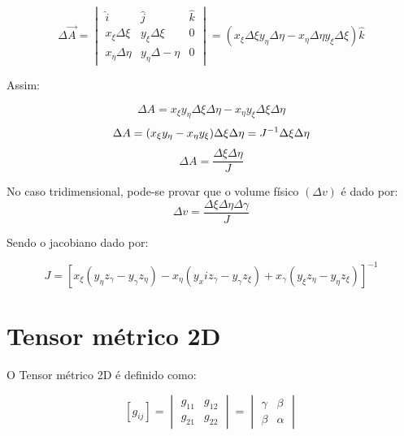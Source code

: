 \begin{equation*}
    \Delta \vec{A} =
    \begin{vmatrix}
        \hat{i} & \hat{j} & \hat{k}\\
        x_\xi \Delta \xi & y_\xi \Delta \xi & 0\\
        x_\eta \Delta \eta & y_\eta \Delta -\eta & 0
    \end{vmatrix}
    = (x_\xi \Delta \xi y_\eta \Delta \eta - x_\eta \Delta \eta y_\xi \Delta \xi)\hat{k}
\end{equation*}

Assim:

\begin{equation*}
    \Delta A = x_\xi y_\eta \Delta \xi \Delta \eta - x_\eta y_\xi \Delta \xi \Delta \eta
\end{equation*}
\begin{equation*}
    \Delta A = (x_\xi y_\eta - x_\eta y_\xi)\Delta \xi \Delta \eta = J^{-1} \Delta \xi \Delta \eta\\
\end{equation*}    
\begin{equation}
    \label{eq:2.15}
    \Delta A = \frac{\Delta \xi \Delta \eta}{J}
\end{equation}

No caso tridimensional, pode-se provar que o volume físico $(\Delta v)$ é dado por:
\begin{equation}
    \label{eq:2.16}
    \Delta v = \frac{\Delta \xi \Delta \eta \Delta \gamma}{J}
\end{equation}

Sendo o jacobiano dado por:

\begin{equation}
    \label{eq:2.17}
    J = [x_\xi(y_\eta z_\gamma - y_\gamma z_\eta) - x_\eta(y_xi z_\gamma - y_\gamma z_\xi) + x_\gamma(y_\xi z_\eta - y_\eta z_\xi)]^{-1}
\end{equation}

\section{Tensor métrico 2D}

O Tensor métrico 2D é definido como:

\begin{equation}
    \label{eq:2.18}
    [g_{ij}] =
    \begin{vmatrix}
        g_{11} & g_{12}\\
        g_{21} & g_{22}
    \end{vmatrix}
    =
    \begin{vmatrix}
        \gamma & \beta\\
        \beta & \alpha
    \end{vmatrix}
\end{equation}

